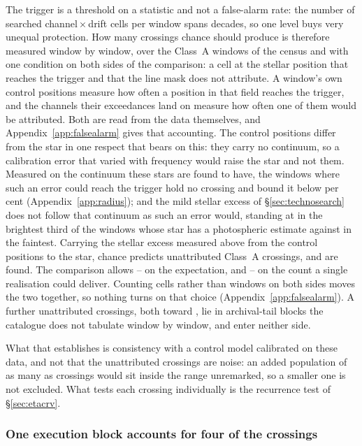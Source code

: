 The trigger is a threshold on a statistic and not a false-alarm rate: the
number of searched channel\,$\times$\,drift cells per window spans
\TuCellsDecades{} decades, so one level buys very unequal protection. How
many crossings chance should produce is therefore measured window by window,
over the \CeNWin{} Class~A windows of the census and with one condition on
both sides of the comparison: a cell at the stellar position that reaches the
trigger and that the line mask does not attribute. A window's own \NCtrl{} control positions measure how often a position in
that field reaches the trigger, and the channels their exceedances land on
measure how often one of them would be attributed. Both are read from the
data themselves, and Appendix~\ref{app:falsealarm} gives that accounting. The control positions differ from the star in one respect that
bears on this: they carry no continuum, so a calibration error that varied
with frequency would raise the star and not them. Measured on the continuum
these stars are found to have, the windows where such an error could reach
the trigger hold no crossing and bound it below \CxResidHiPct{} per cent
(Appendix~\ref{app:radius}); and the mild stellar excess of
\S\ref{sec:technosearch} does not follow that continuum as such an error
would, standing at \CkRatioContBright{} in the brightest third of the
\CkNContWin{} windows whose star has a photospheric estimate against
\CkRatioContFaint{} in the faintest. Carrying the stellar excess measured above from the control positions to
the star, chance predicts \CeExpX{} unattributed Class~A crossings, and
\CeObs{} are found. The comparison allows \CeLo--\CeHi{} on the expectation,
and \CeCntLo--\CeCntHi{} on the count a single realisation could deliver. Counting cells rather than windows on both
sides moves the two together, so nothing turns on that choice
(Appendix~\ref{app:falsealarm}). A further \CeNTailCrossWord{} unattributed
crossings, both toward \CeTailStar, lie in archival-tail blocks the catalogue
does not tabulate window by window, and enter neither side.

What that establishes is consistency with a control model calibrated on these
data, and not that the unattributed crossings are noise: an added population
of as many as \CeAddBlind{} crossings would sit inside the range unremarked,
so a smaller one is not excluded. What tests each crossing individually is the
recurrence test of \S\ref{sec:etacrv}.

\subsubsection{One execution block accounts for four of the crossings}
\label{sec:bdblock}

